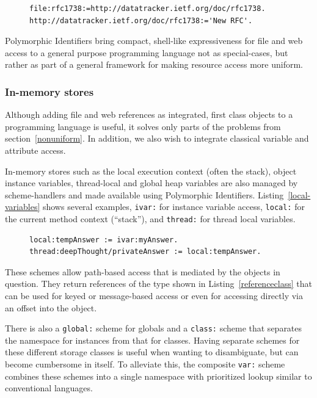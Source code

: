 \documentclass[preprint]{sigplanconf}
\begin{document}
\begin{figure}[htbp]
\begin{lstlisting}[style=numbers,label=download-to-file,caption=Downloading an RFC to a file.]
file:rfc1738:=http://datatracker.ietf.org/doc/rfc1738.
http://datatracker.ietf.org/doc/rfc1738:='New RFC'.
\end{lstlisting}
\end{figure}


Polymorphic Identifiers bring compact, shell-like expressiveness for file and web access
to a general purpose programming language not as special-cases, but rather as part of 
a general framework for making resource access more uniform.


\subsubsection{In-memory stores}

\label{inmemory}

Although adding file and web references as integrated, first class objects to a programming
language is useful, it solves only parts of the problems from section~\ref{nonuniform}.
In addition, we also wish to integrate classical variable and attribute access.

In-memory stores such as the local execution context (often the stack), object instance
variables, thread-local and global heap variables are also managed by scheme-handlers
and made available using Polymorphic Identifiers.  Listing~\ref{local-variables} shows
several examples, {\tt ivar:} for instance variable access, {\tt local:} for the current
method context (``stack''), and {\tt thread:} for thread local variables.

\begin{figure}[htbp]
\begin{lstlisting}[style=numbers,label=local-variables,caption=Different memory variables.]
local:tempAnswer := ivar:myAnswer.
thread:deepThought/privateAnswer := local:tempAnswer.
\end{lstlisting}
\end{figure}

These schemes allow path-based access that is mediated by the objects in question. 
They return references of the type shown in Listing~\ref{referenceclass} that can
be used for keyed or message-based access or even for accessing directly
via an offset into the object.

There is also a {\tt global:} scheme for globals and a {\tt class:} scheme that separates
the namespace for instances from that for classes.  Having separate schemes for
these different storage classes is useful when wanting to disambiguate,
but can become cumbersome in itself.  To alleviate this, the composite
{\tt var:} scheme combines these schemes into a single namespace
with prioritized lookup similar to conventional languages.  
\end{document}
